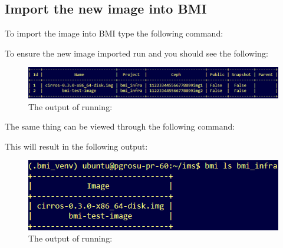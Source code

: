 \subsection{Import the new image into BMI}

To import the image into BMI type the following command: 


To ensure the new image imported run  and you should see the following: \\


\begin{figure}[!h] %
\label{fig:bmi-workflow}
\begin{center}
\includegraphics[scale=0.7]{figures/bmi-import-db-ls.png}
\end{center}
\caption{The output of running: }
\end{figure}

The same thing can be viewed through the following command: \\


This will result in the following output:

\begin{figure}[!h] %
\label{fig:bmi-workflow}
\begin{center}
\includegraphics[scale=0.7]{figures/bmi-ls.png}
\end{center}
\caption{The output of running: }
\end{figure}


